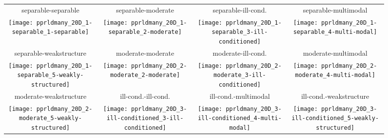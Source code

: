 \documentclass{sig-alternate}
\begin{document}



\begin{figure*}
\begin{tabular}{@{\hspace*{-0.009\textwidth}}c@{\hspace*{-0.014\textwidth}}c@{\hspace*{-0.016\textwidth}}c@{\hspace*{-0.02\textwidth}}c}
separable-separable & separable-moderate & separable-ill-cond. & separable-multimodal\\
\texttt{[image: pprldmany\_20D\_1-separable\_1-separable]} &
\texttt{[image: pprldmany\_20D\_1-separable\_2-moderate]} &
\texttt{[image: pprldmany\_20D\_1-separable\_3-ill-conditioned]} &
\texttt{[image: pprldmany\_20D\_1-separable\_4-multi-modal]}\\
separable-weakstructure & moderate-moderate & moderate-ill-cond. & moderate-multimodal\\
\texttt{[image: pprldmany\_20D\_1-separable\_5-weakly-structured]} &
\texttt{[image: pprldmany\_20D\_2-moderate\_2-moderate]} &
\texttt{[image: pprldmany\_20D\_2-moderate\_3-ill-conditioned]} &
\texttt{[image: pprldmany\_20D\_2-moderate\_4-multi-modal]}\\
moderate-weakstructure & ill-cond.-ill-cond. & ill-cond.-multimodal & ill-cond.-weakstructure\\
\texttt{[image: pprldmany\_20D\_2-moderate\_5-weakly-structured]} &
\texttt{[image: pprldmany\_20D\_3-ill-conditioned\_3-ill-conditioned]} &
\texttt{[image: pprldmany\_20D\_3-ill-conditioned\_4-multi-modal]} &
\texttt{[image: pprldmany\_20D\_3-ill-conditioned\_5-weakly-structured]} \\

\end{tabular}
\end{figure*}
\end{document}
